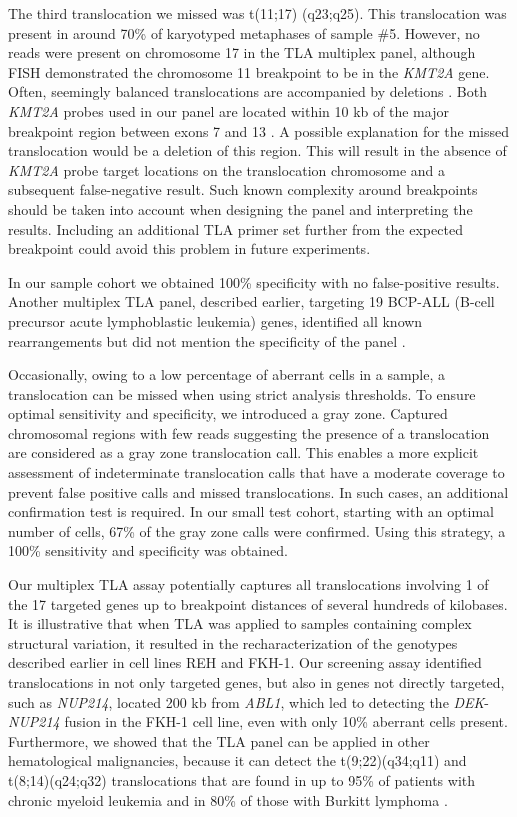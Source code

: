 The third translocation we missed was t(11;17) (q23;q25). 
This translocation was present in around 70\% of karyotyped metaphases of sample \#5. 
However, no reads were present on chromosome 17 in the TLA multiplex panel, although FISH demonstrated the chromosome 11 breakpoint to be in the \textsl{KMT2A} gene.
Often, seemingly balanced translocations are accompanied by deletions \cite{Mertens_2015}.
Both \textsl{KMT2A} probes used in our panel are located within 10 kb of the major breakpoint region between exons 7 and 13 \cite{Burmeister_2015}. 
A possible explanation for the missed translocation would be a deletion of this region. 
This will result in the absence of \textsl{KMT2A} probe target locations on the translocation chromosome and a subsequent false-negative result. 
Such known complexity around breakpoints should be taken into account when designing the panel and interpreting the results. 
Including an additional TLA primer set further from the expected breakpoint could avoid this problem in future experiments. 

In our sample cohort we obtained 100\% specificity with no false-positive results. 
Another multiplex TLA panel, described earlier, targeting 19 BCP-ALL (B-cell precursor acute lymphoblastic leukemia) genes, identified all known rearrangements but did not mention the specificity of the panel \cite{Kuiper_2015}.

Occasionally, owing to a low percentage of aberrant cells in a sample, a translocation can be missed when using strict analysis thresholds. 
To ensure optimal sensitivity and specificity, we introduced a gray zone. 
Captured chromosomal regions with few reads suggesting the presence of a translocation are considered as a gray zone translocation call. 
This enables a more explicit assessment of indeterminate translocation calls that have a moderate coverage to prevent false positive calls and missed translocations.
In such cases, an additional confirmation test is required.
In our small test cohort, starting with an optimal number of cells, 67\% of the gray zone calls were confirmed. 
Using this strategy, a 100\% sensitivity and specificity was obtained. 

Our multiplex TLA assay potentially captures all translocations involving 1 of the 17 targeted genes up to breakpoint distances of several hundreds of kilobases. 
It is illustrative that when TLA was applied to samples containing complex structural variation, it resulted in the recharacterization of the genotypes described earlier in cell lines REH and FKH-1. 
Our screening assay identified translocations in not only targeted genes, but also in genes not directly targeted, such as \textsl{NUP214}, located 200 kb from \textsl{ABL1}, which led to detecting the \textsl{DEK}-\textsl{NUP214} fusion in the FKH-1 cell line, even with only 10\% aberrant cells present.
Furthermore, we showed that the TLA panel can be applied in other hematological malignancies, because it can detect the t(9;22)(q34;q11) and t(8;14)(q24;q32) translocations that are found in up to 95\% of patients with chronic myeloid leukemia and in 80\% of those with Burkitt lymphoma \cite{Faderl_1999,Ferry_2006}. 

